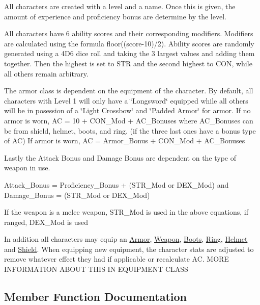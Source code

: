 All characters are created with a level and a name. Once this is given, the amount of experience and proficiency bonus are determine by the level.

All characters have 6 ability scores and their corresponding modifiers. Modifiers are calculated using the formula floor((score-\/10)/2). Ability scores are randomly generated using a 4\+D6 dice roll and taking the 3 largest values and adding them together. Then the highest is set to S\+TR and the second highest to C\+ON, while all others remain arbitrary.

The armor class is dependent on the equipment of the character. By default, all characters with Level 1 will only have a \char`\"{}\+Longsword\char`\"{} equipped while all others will be in posession of a \char`\"{}\+Light Crossbow\char`\"{} and \char`\"{}\+Padded Armor\char`\"{} for armor. If no armor is worn, AC = 10 + C\+O\+N\+\_\+\+Mod + A\+C\+\_\+\+Bonuses where A\+C\+\_\+\+Bonuses can be from shield, helmet, boots, and ring. (if the three last ones have a bonus type of AC) If armor is worn, AC = Armor\+\_\+\+Bonus + C\+O\+N\+\_\+\+Mod + A\+C\+\_\+\+Bonuses

Lastly the Attack Bonus and Damage Bonus are dependent on the type of weapon in use.

Attack\+\_\+\+Bonus = Proficiency\+\_\+\+Bonus + (S\+T\+R\+\_\+\+Mod or D\+E\+X\+\_\+\+Mod) and Damage\+\_\+\+Bonus = (S\+T\+R\+\_\+\+Mod or D\+E\+X\+\_\+\+Mod)

If the weapon is a melee weapon, S\+T\+R\+\_\+\+Mod is used in the above equations, if ranged, D\+E\+X\+\_\+\+Mod is used

In addition all characters may equip an \hyperlink{class_armor}{Armor}, \hyperlink{class_weapon}{Weapon}, \hyperlink{class_boots}{Boots}, \hyperlink{class_ring}{Ring}, \hyperlink{class_helmet}{Helmet} and \hyperlink{class_shield}{Shield}. When equipping new equipment, the character stats are adjusted to remove whatever effect they had if applicable or recalculate AC. M\+O\+RE I\+N\+F\+O\+R\+M\+A\+T\+I\+ON A\+B\+O\+UT T\+H\+IS IN E\+Q\+U\+I\+P\+M\+E\+NT C\+L\+A\+SS 

\subsection{Member Function Documentation}
\hypertarget{class_characters_a1273e2d7fe2e959cd3ed513c5717f6b7}{}\label{class_characters_a1273e2d7fe2e959cd3ed513c5717f6b7} 
